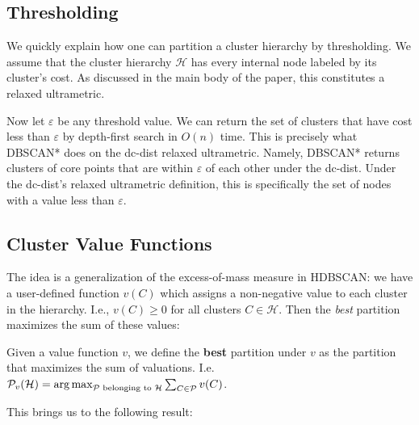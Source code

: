 \subsection{Thresholding}
\label{app:thresholding}

We quickly explain how one can partition a cluster hierarchy by thresholding. We assume that the cluster hierarchy $\mathcal{H}$ has every internal node labeled by its cluster's cost. As discussed in the main body of the paper, this constitutes a relaxed ultrametric.

Now let $\varepsilon$ be any threshold value. We can return the set of clusters that have cost less than $\varepsilon$ by depth-first search in $O(n)$ time. This is precisely what DBSCAN* does on the dc-dist relaxed ultrametric. Namely, DBSCAN* returns clusters of core points that are within $\varepsilon$ of each other under the dc-dist. Under the dc-dist's relaxed ultrametric definition, this is specifically the set of nodes with a value less than $\varepsilon$.

\subsection{Cluster Value Functions}
\label{app:cluster_merging_rules}

The idea is a generalization of the excess-of-mass measure in HDBSCAN: we have a user-defined function $v(C)$ which assigns a non-negative value to each cluster in the hierarchy. I.e., $v(C) \geq 0$ for all clusters $C \in \mathcal{H}$. Then the \emph{best} partition maximizes the sum of these values:

\begin{definition}
    Given a value function $v$, we define the \textbf{best} partition under $v$ as the partition that maximizes the sum of valuations. I.e. $\mathcal{P}_v(\mathcal{H}) = \operatorname*{arg\,max}_{\mathcal{P} \text{ belonging to } \mathcal{H}} \sum_{C \in \mathcal{P}} v(C)$.
\end{definition}

This brings us to the following result:

